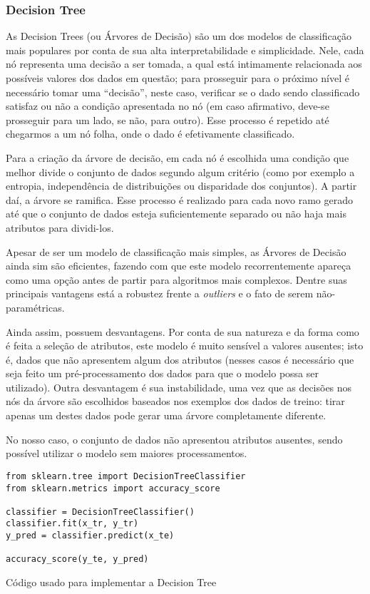 \documentclass[]{IEEEphot}
\begin{document}
\subsubsection{Decision Tree}

As Decision Trees (ou Árvores de Decisão) são um dos modelos de classificação mais populares por conta de sua alta interpretabilidade e simplicidade. Nele, cada nó representa uma decisão a ser tomada, a qual está intimamente relacionada aos possíveis valores dos dados em questão; para prosseguir para o próximo nível é necessário tomar uma “decisão”, neste caso, verificar se o dado sendo classificado satisfaz ou não a condição apresentada no nó (em caso afirmativo, deve-se prosseguir para um lado, se não, para outro). Esse processo é repetido até chegarmos a um nó folha, onde o dado é efetivamente classificado.

Para a criação da árvore de decisão, em cada nó é escolhida uma condição que melhor divide o conjunto de dados segundo algum critério (como por exemplo a entropia, independência de distribuições ou disparidade dos conjuntos). A partir daí, a árvore se ramifica. Esse processo é realizado para cada novo ramo gerado até que o conjunto de dados esteja suficientemente separado ou não haja mais atributos para dividi-los.

Apesar de ser um modelo de classificação mais simples, as Árvores de Decisão ainda sim são eficientes, fazendo com que este modelo recorrentemente apareça como uma opção antes de partir para algoritmos mais complexos. Dentre suas principais vantagens está a robustez frente a \textit{outliers} e o fato de serem não-paramétricas.

Ainda assim, possuem desvantagens. Por conta de sua natureza e da forma como é feita a seleção de atributos, este modelo é muito sensível a valores ausentes; isto é, dados que não apresentem algum dos atributos (nesses casos é necessário que seja feito um pré-processamento dos dados para que o modelo possa ser utilizado). Outra desvantagem é sua instabilidade, uma vez que as decisões nos nós da árvore são escolhidos baseados nos exemplos dos dados de treino: tirar apenas um destes dados pode gerar uma árvore completamente diferente.

No nosso caso, o conjunto de dados não apresentou atributos ausentes, sendo possível utilizar o modelo sem maiores processamentos. 

\begin{listing}[!ht]
\begin{verbatim}
from sklearn.tree import DecisionTreeClassifier
from sklearn.metrics import accuracy_score

classifier = DecisionTreeClassifier()
classifier.fit(x_tr, y_tr)
y_pred = classifier.predict(x_te)

accuracy_score(y_te, y_pred)
\end{verbatim}

\caption{Código usado para implementar a Decision Tree}

\end{listing}
\end{document}
